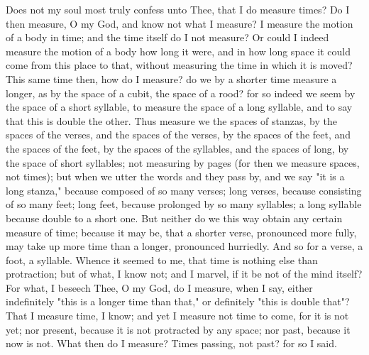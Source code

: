 \documentclass[b5paper,openright,12pt,twoside]{book}
\begin{document}
Does not my soul most truly confess unto Thee, that I do measure times?
Do I then measure, O my God, and know not what I measure? I measure the
motion of a body in time; and the time itself do I not measure? Or could
I indeed measure the motion of a body how long it were, and in how long
space it could come from this place to that, without measuring the time
in which it is moved? This same time then, how do I measure? do we by a
shorter time measure a longer, as by the space of a cubit, the space
of a rood? for so indeed we seem by the space of a short syllable, to
measure the space of a long syllable, and to say that this is double
the other. Thus measure we the spaces of stanzas, by the spaces of the
verses, and the spaces of the verses, by the spaces of the feet, and the
spaces of the feet, by the spaces of the syllables, and the spaces of
long, by the space of short syllables; not measuring by pages (for then
we measure spaces, not times); but when we utter the words and they pass
by, and we say "it is a long stanza," because composed of so many verses;
long verses, because consisting of so many feet; long feet, because
prolonged by so many syllables; a long syllable because double to a
short one. But neither do we this way obtain any certain measure of
time; because it may be, that a shorter verse, pronounced more fully,
may take up more time than a longer, pronounced hurriedly. And so for a
verse, a foot, a syllable. Whence it seemed to me, that time is nothing
else than protraction; but of what, I know not; and I marvel, if it
be not of the mind itself? For what, I beseech Thee, O my God, do I
measure, when I say, either indefinitely "this is a longer time than
that," or definitely "this is double that"? That I measure time, I know;
and yet I measure not time to come, for it is not yet; nor present,
because it is not protracted by any space; nor past, because it now is
not. What then do I measure? Times passing, not past? for so I said.
\end{document}
